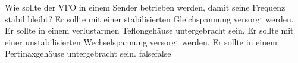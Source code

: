     {Wie sollte der VFO in einem Sender betrieben werden, damit seine Frequenz stabil bleibt?}
    {Er sollte mit einer stabilisierten Gleichspannung versorgt werden.}
    {Er sollte in einem verlustarmen Teflongehäuse untergebracht sein.}
    {Er sollte mit einer unstabilisierten Wechselspannung versorgt werden. }
    {Er sollte in einem Pertinaxgehäuse untergebracht sein.}
    {false}{false}